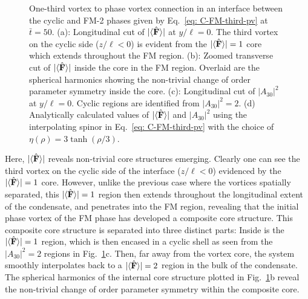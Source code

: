 \begin{figure}
    \caption[Dynamics of a one-third vortex to singly quantised vortex
    connection in a cyclic to ferromagnetic interface]
    {\label{fig: C-FM-third-SQV}One-third vortex to phase vortex connection in
    an interface between the cyclic and FM-2 phases given by
    Eq.~\eqref{eq: C-FM-third-pv} at \(\bar{t} = 50\).
    (a): Longitudinal cut of \(|\langle \hat{\vb{F}} \rangle | \) at \(y/\ell=0\).
    The third vortex on the cyclic side (\(z/\ell < 0\)) is evident from the
    \(|\langle \hat{\vb{F}} \rangle | = 1\) core which extends throughout the FM region.
    (b): Zoomed transverse cut of \(|\langle \hat{\vb{F}} \rangle | \) inside the core in the FM
    region.
    Overlaid are the spherical harmonics showing the non-trivial change
    of order parameter symmetry inside the core.
    (c): Longitudinal cut of \(|A_{30}|^2\) at \(y/\ell=0\).
    Cyclic regions are identified from \(|A_{30}|^2=2\).
    (d) Analytically calculated values of \(|\langle \hat{\vb{F}} \rangle | \) and \(|A_{30}|^2\)
    using the interpolating spinor in Eq.~\eqref{eq: C-FM-third-pv} with the
    choice of \(\eta(\rho) = 3\tanh(\rho/3)\).}
\end{figure}
Here, \(|\langle \hat{\vb{F}} \rangle | \) reveals non-trivial core structures emerging.
Clearly one can see the third vortex on the cyclic side of the interface
(\(z/\ell < 0\)) evidenced by the \(|\langle \hat{\vb{F}} \rangle | = 1\) core.
However, unlike the previous case where the vortices spatially separated, this
\(|\langle \hat{\vb{F}} \rangle | = 1\) region then extends throughout the longitudinal extent of the
condensate, and penetrates into the FM region, revealing that the initial phase
vortex of the FM phase has developed a composite core structure.
This composite core structure is separated into three distinct parts:
Inside is the \(|\langle \hat{\vb{F}} \rangle | = 1\) region, which is then encased in a cyclic shell
as seen from the \(|A_{30}|^2=2\) regions in Fig.~\ref{fig: C-FM-third-SQV}c.
Then, far away from the vortex core, the system smoothly interpolates back to
a \(|\langle \hat{\vb{F}} \rangle | = 2\) region in the bulk of the condensate.
The spherical harmonics of the internal core structure plotted in
Fig.~\ref{fig: C-FM-third-SQV}b reveal the non-trivial change of order parameter
symmetry within the composite core.

